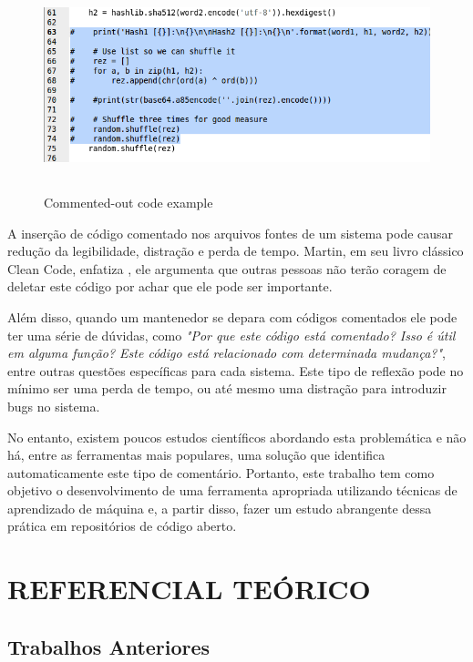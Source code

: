 \documentclass{abnt}
\begin{document}
\begin{figure}[h!]
  \centering
  \includegraphics[height=2.4in,width=6.3in]{images/gcc06.png}
  \caption{Commented-out code example }
  \label{fig:commentExample}
\end{figure}


A inserção de código comentado nos arquivos fontes de um sistema pode causar
redução da legibilidade, distração e perda de tempo. Martin, em seu livro clássico
Clean Code, enfatiza \cite[Few practices are as odious as commenting-out code. 
Don’t do this!]{cleanCode}, ele argumenta que outras pessoas não terão coragem de deletar 
este código por achar que ele pode ser importante. 

Além disso, quando um mantenedor se depara com códigos comentados ele pode ter uma 
série de dúvidas, como \textit{"Por que este código está comentado? Isso é útil em 
alguma função? Este código está relacionado com determinada mudança?"}, entre outras 
questões específicas para cada sistema. Este tipo de reflexão pode no mínimo ser 
uma perda de tempo, ou até mesmo uma distração para introduzir bugs no sistema.

No entanto, existem poucos estudos científicos abordando esta problemática e não 
há, entre as ferramentas mais populares, uma solução que identifica automaticamente
este tipo de comentário. Portanto, este trabalho tem como objetivo o desenvolvimento
de uma ferramenta apropriada utilizando técnicas de aprendizado de máquina e, a partir
disso, fazer um estudo abrangente dessa prática em repositórios de código aberto.


\chapter{REFERENCIAL TEÓRICO}


\section{Trabalhos Anteriores}
\end{document}
